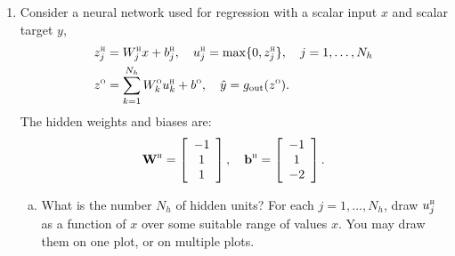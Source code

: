 \documentclass[11pt]{article}
\newcommand{\bbf}{\mathbf{b}}
\newcommand{\Wbf}{\mathbf{W}}
\def\hid{\textsc{\tiny H}}
\def\out{\textsc{\tiny O}}
\begin{document}
\begin{enumerate}
\begin{enumerate}[(a)]
$\hat{y} = 1$ when $z^\out \geq 0$, which occurs when:
\[
u_1^\hid + u_2^\hid - u_3^\hid - u_4^\hid \geq 1.5
\]
Since the left side is an integer, this means:
\[
u_1^\hid + u_2^\hid - u_3^\hid - u_4^\hid \geq 2
\]
This is satisfied when:
\begin{itemize}
\item $u_1^\hid = u_2^\hid = u_4^\hid = 1$ and $u_3^\hid = 0$, i.e., $x_1 + x_3 \geq 0$, $x_2 + x_3 \geq 0$, $x_1 + x_2 < 1$, and $x_1 + x_2 + x_3 \geq -1$
\item $u_1^\hid = u_2^\hid = u_3^\hid = u_4^\hid = 1$, i.e., $x_1 + x_3 \geq 0$, $x_2 + x_3 \geq 0$, $x_1 + x_2 \geq 1$, and $x_1 + x_2 + x_3 \geq -1$
\end{itemize}
The feasible regions are:
\begin{align*}
\hat{y} = 1 \text{ when: } &(x_1 + x_3 \geq 0) \land (x_2 + x_3 \geq 0) \land (x_1 + x_2 < 1) \land (x_1 + x_2 + x_3 \geq -1) \\
&\text{OR } (x_1 + x_3 \geq 0) \land (x_2 + x_3 \geq 0) \land (x_1 + x_2 \geq 1) \land (x_1 + x_2 + x_3 \geq -1)
\end{align*}
\end{enumerate}



\item Consider a neural network used for regression with a scalar input $x$ and
scalar target $y$,
\begin{align*}
    & z_{j}^\hid = W^\hid_{j}x + b^\hid_j, \quad
    u_{j}^\hid = \max\{0, z^\hid_j\},
    \quad j=1,\ldots,N_h \\
    &
    z^\out = \sum_{k=1}^{N_h} W^\out_{k}u^\hid_{k} + b^\out,
    \quad
    \hat{y} = g_{\rm out}(z^\out).
\end{align*}
The hidden weights and biases are:
\[
    \Wbf^\hid = \left[ \begin{array}{c} -1  \\ 1  \\  1 \end{array} \right], \quad
    \bbf^\hid = \left[ \begin{array}{c} -1 \\ 1 \\ -2 \end{array} \right].
\]

\begin{enumerate}[(a)]

\item What is the number $N_h$ of hidden units?  For each $j=1,\ldots,N_h$,
draw $u^\hid_j$ as a function of $x$ over some suitable range of values $x$.
You may draw them on one plot, or on
multiple plots.


\end{enumerate}
\end{enumerate}
\end{document}

